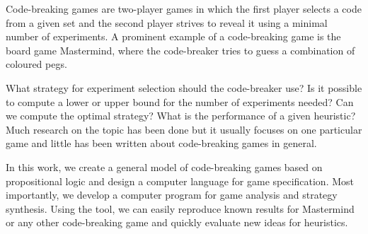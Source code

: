 \begin{ThesisAbstract}
Code-breaking games are two-player games in which the first player selects
  a code from a given set and the second player strives to reveal it using a
  minimal number of experiments.
A prominent example of a code-breaking game is the board game Mastermind,
  where the code-breaker tries to guess a combination of coloured pegs.

What strategy for experiment selection should the code-breaker use?
Is it possible to compute a lower or upper bound for the number of experiments needed?
Can we compute the optimal strategy?
What is the performance of a given heuristic?
Much research on the topic has been done but it usually focuses
  on one particular game and little has been written about code-breaking
  games in general.

In this work, we create a general model of code-breaking games
  based on propositional logic
  and design a computer language for game specification.
Most importantly, we develop a computer program for game analysis
  and strategy synthesis.
Using the tool, we can easily reproduce known results for Mastermind or
  any other code-breaking game and quickly evaluate new ideas
  for heuristics.
\end{ThesisAbstract}

\MainMatter
\setlength{\parindent}{0pt}

\setcounter{secnumdepth}{1}
\setcounter{tocdepth}{2}
\begin{spacing}{1.2} \normalsize
\tableofcontents
\end{spacing}










\pagestyle{plain}
\printbibliography

% 


